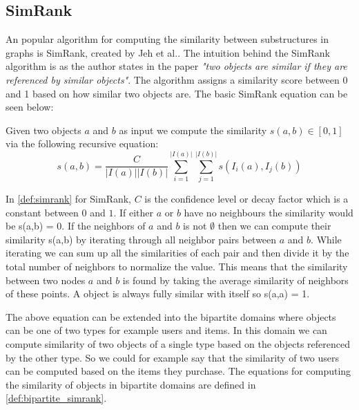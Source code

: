 \subsection{SimRank}
An popular algorithm for computing the similarity between substructures in graphs is SimRank, created by Jeh et al.\cite{10.1145/775047.775126}. The intuition behind the SimRank algorithm is as the author states in the paper \emph{"two objects are similar if they are referenced by similar objects"}\cite{10.1145/775047.775126}. The algorithm assigns a similarity score between 0 and 1 based on how similar two objects are. The basic SimRank equation can be seen below:
\begin{definition}[SimRank]\label{def:simrank} Given two objects $a$ and $b$ as input we compute the similarity $s(a,b) \in [0,1]$ via the following recursive equation:
	\begin{equation}\label{eq:basic_simrank}
	s(a,b)= \frac{C}{|I(a)||I(b)|}\sum^{|I(a)|}_{i=1}\sum^{|I(b)|}_{j=1}s(I_i(a),I_j(b))
	\end{equation}
\end{definition}
In \autoref{def:simrank} for SimRank, $C$ is the confidence level or decay factor which is a constant between $0$ and $1$. If either $a$ or $b$ have no neighbours the similarity would be s(a,b) = 0. If the neighbors of $a$ and $b$  is not $\emptyset$ then we can compute their similarity s(a,b) by iterating through all neighbor pairs between $a$ and $b$. While iterating we can sum up all the similarities of each pair and then divide it by the total number of neighbors to normalize the value. This means that the similarity between two nodes $a$ and $b$ is found by taking the average similarity of neighbors of these points. A object is always fully similar with itself so s(a,a) = 1.

The above equation can be extended into the bipartite domains where objects can be one of two types for example users and items. In this domain we can compute similarity of two objects of a single type based on the objects referenced by the other type. So we could for example say that the similarity of two users can be computed based on the items they purchase. The equations for computing the similarity of objects in bipartite domains are defined in \autoref{def:bipartite_simrank}.

